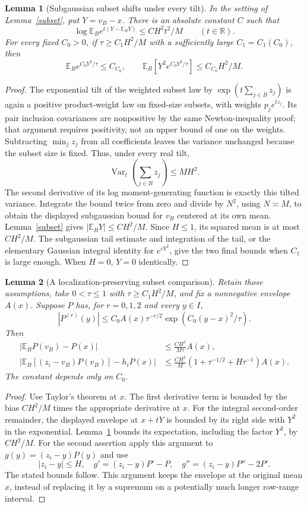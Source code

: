 \documentclass[11pt]{article}
\newtheorem{lemma}{Lemma}\newtheorem{theorem}{Theorem}
\newcommand{\E}{\mathbb E}\newcommand{\Pol}{\operatorname{Pol}}
\begin{document}
\begin{lemma}[Subgaussian subset shifts under every tilt]\label{subgaussian}
In the setting of Lemma~\ref{subset}, put $Y=v_B-x$. There is an
absolute constant $C$ such that
\[
 \log\E_B e^{t(Y-\E_BY)}\le CH^2t^2/M\qquad(t\in\mathbb R).
\]
For every fixed $C_0>0$, if $\tau\ge C_1H^2/M$ with a sufficiently
large $C_1=C_1(C_0)$, then
\[
 \E_B e^{C_0Y^2/\tau}\le C_{C_0},\qquad
 \E_B[Y^2e^{C_0Y^2/\tau}]\le C_{C_0}H^2/M.
\]
\end{lemma}
\begin{proof}
The exponential tilt of the weighted subset law by
$\exp(t\sum_{j\in B}z_j)$ is again a positive product-weight law on
fixed-size subsets, with weights $p_j e^{tz_j}$. Its pair inclusion
covariances are nonpositive by the same Newton-inequality proof; that
argument requires positivity, not an upper bound of one on the weights.
Subtracting $\min_jz_j$ from all coefficients leaves the variance
unchanged because the subset size is fixed. Thus, under every real tilt,
\[
 \operatorname{Var}_t\left(\sum_{j\in B}z_j\right)\le MH^2.
\]
The second derivative of its log moment-generating function is exactly
this tilted variance. Integrate the bound twice from zero and divide
by $N^2$, using $N\asymp M$, to obtain the displayed subgaussian bound
for $v_B$ centered at its own mean.
Lemma~\ref{subset} gives $|\E_BY|\le CH^2/M$. Since $H\le1$, its
squared mean is at most $CH^2/M$. The subgaussian tail estimate and
integration of the tail, or the elementary Gaussian integral identity
for $e^{cY^2}$, give the two final bounds when $C_1$ is large enough.
When $H=0$, $Y=0$ identically.
\end{proof}

\begin{lemma}[A localization-preserving subset comparison]\label{localized}
Retain those assumptions, take $0<\tau\le1$ with
$\tau\ge C_1H^2/M$, and fix a nonnegative envelope $A(x)$.
Suppose $P$ has, for $r=0,1,2$ and every $y\in I$,
\[
 |P^{(r)}(y)|\le C_0 A(x)\tau^{-r/2}
                       \exp(C_0(y-x)^2/\tau).
\]
Then
\begin{align*}
 |\E_BP(v_B)-P(x)|
   &\le \frac{C H^2}{M\tau}A(x),\\
 |\E_B[(z_i-v_B)P(v_B)]-h_iP(x)|
   &\le \frac{CH^2}{M}
           (1+\tau^{-1/2}+H\tau^{-1})A(x).
\end{align*}
The constant depends only on $C_0$.
\end{lemma}
\begin{proof}
Use Taylor's theorem at $x$. The first derivative term is bounded
by the bias $CH^2/M$ times the appropriate derivative at $x$.
For the integral second-order remainder, the displayed envelope at
$x+tY$ is bounded by its right side with $Y^2$ in the exponential.
Lemma~\ref{subgaussian} bounds its expectation, including the factor
$Y^2$, by $CH^2/M$. For the second assertion apply this argument to
$g(y)=(z_i-y)P(y)$ and use
\[
 |z_i-y|\le H,\quad
 g'=(z_i-y)P'-P,\quad g''=(z_i-y)P''-2P'.
\]
The stated bounds follow. This argument keeps the envelope at the
original mean $x$, instead of replacing it by a supremum on a
potentially much longer row-range interval.
\end{proof}
\end{document}
